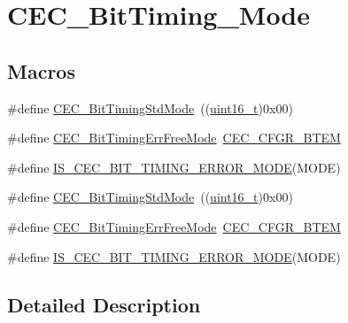 \hypertarget{group___c_e_c___bit_timing___mode}{}\section{C\+E\+C\+\_\+\+Bit\+Timing\+\_\+\+Mode}
\label{group___c_e_c___bit_timing___mode}
\subsection*{Macros}
\begin{DoxyCompactItemize}
\item 
\#define \hyperlink{group___c_e_c___bit_timing___mode_gaf6866e5087bb01c1ea4e20a207a1f691}{C\+E\+C\+\_\+\+Bit\+Timing\+Std\+Mode}~((\hyperlink{_p_e___types_8h_a1f1825b69244eb3ad2c7165ddc99c956}{uint16\+\_\+t})0x00)
\item 
\#define \hyperlink{group___c_e_c___bit_timing___mode_ga4fd44675c774985d1f6cd8976b18c947}{C\+E\+C\+\_\+\+Bit\+Timing\+Err\+Free\+Mode}~\hyperlink{group___peripheral___registers___bits___definition_ga8b06cd4e47f4235d8880e1ba0e56e2d7}{C\+E\+C\+\_\+\+C\+F\+G\+R\+\_\+\+B\+T\+EM}
\item 
\#define \hyperlink{group___c_e_c___bit_timing___mode_ga55494269b2c9c55c11130a429f418a8d}{I\+S\+\_\+\+C\+E\+C\+\_\+\+B\+I\+T\+\_\+\+T\+I\+M\+I\+N\+G\+\_\+\+E\+R\+R\+O\+R\+\_\+\+M\+O\+DE}(M\+O\+DE)
\item 
\#define \hyperlink{group___c_e_c___bit_timing___mode_gaf6866e5087bb01c1ea4e20a207a1f691}{C\+E\+C\+\_\+\+Bit\+Timing\+Std\+Mode}~((\hyperlink{_p_e___types_8h_a1f1825b69244eb3ad2c7165ddc99c956}{uint16\+\_\+t})0x00)
\item 
\#define \hyperlink{group___c_e_c___bit_timing___mode_ga4fd44675c774985d1f6cd8976b18c947}{C\+E\+C\+\_\+\+Bit\+Timing\+Err\+Free\+Mode}~\hyperlink{group___peripheral___registers___bits___definition_ga8b06cd4e47f4235d8880e1ba0e56e2d7}{C\+E\+C\+\_\+\+C\+F\+G\+R\+\_\+\+B\+T\+EM}
\item 
\#define \hyperlink{group___c_e_c___bit_timing___mode_ga55494269b2c9c55c11130a429f418a8d}{I\+S\+\_\+\+C\+E\+C\+\_\+\+B\+I\+T\+\_\+\+T\+I\+M\+I\+N\+G\+\_\+\+E\+R\+R\+O\+R\+\_\+\+M\+O\+DE}(M\+O\+DE)
\end{DoxyCompactItemize}


\subsection{Detailed Description}


